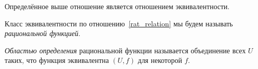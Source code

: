 	\begin{statement} 
		Определённое выше отношение является отношением эквивалентности.  
	\end{statement}

	\begin{definition}\label{rat_func} 
		Класс эквивалентности по отношению~\ref{rat_relation} мы будем называть \emph{рациональной функцией}.  

		\emph{Областью определения} рациональной функции называется объединение всех $U$ таких, что функция эквивалентна $(U, f)$ для некоторой $f$.
	\end{definition}



